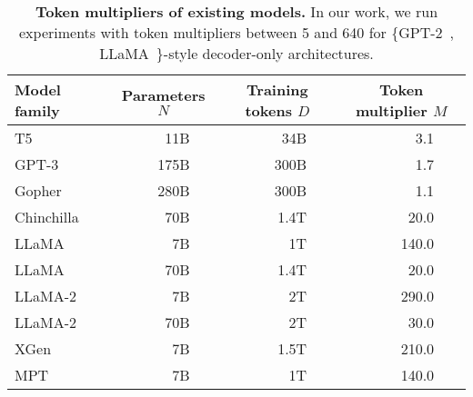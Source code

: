 \begin{table}[t!]
    \centering
    \small
    \caption{\textbf{Token multipliers of existing models.} In our work, we run experiments with token multipliers between 5 and 640 for \{GPT-2~\cite{Radford2019LanguageMA}, LLaMA~\cite{llama}\}-style decoder-only architectures.}
    \begin{tabular}{lp{1em}rlp{1.5em}rlp{2em}rl}
        \toprule
         Model family & \multicolumn{3}{c}{Parameters $N$} & \multicolumn{3}{c}{Training tokens $D$} & \multicolumn{3}{c}{Token multiplier $M$} \\
         \midrule
         T5~\cite{raffel2020exploring} & & 11B  & & & 34B  & & & 3.1\\
         GPT-3~\cite{gpt3}             & & 175B & & & 300B & & & 1.7\\
         Gopher~\cite{gopher}          & & 280B & & & 300B & & & 1.1\\
         Chinchilla~\cite{chinchilla}  & & 70B  & & & 1.4T & & & 20{.0}\\
         LLaMA~\cite{llama}            & & 7B   & & & 1T   & & & 140{.0}\\
         LLaMA~\cite{llama}            & & 70B  & & & 1.4T & & & 20{.0} \\
         LLaMA-2~\cite{llama2}         & & 7B   & & & 2T   & & & 290{.0} \\
         LLaMA-2~\cite{llama2}         & & 70B  & & & 2T   & & & 30{.0} \\
         XGen~\cite{XGen}              & & 7B   & & & 1.5T & & & 210{.0}\\
         MPT~\cite{MosaicML2023Introducing} & & 7B & & & 1T & & & 140{.0} \\\bottomrule
    \end{tabular}
    \label{tab:other_mults}
\end{table}